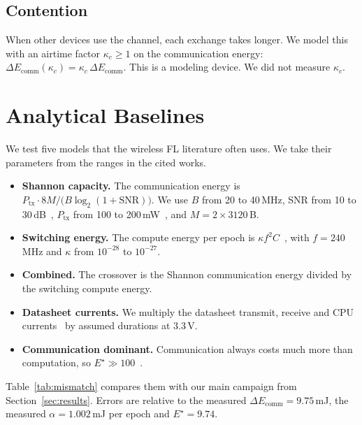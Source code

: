 \documentclass[journal]{IEEEtran}
\newcommand{\Estar}{E^{\star}}
\begin{document}
\subsection{Contention}
When other devices use the channel, each exchange takes longer. We model this with an airtime factor $\kappa_c\ge1$ on the communication energy: $\Delta E_{\mathrm{comm}}(\kappa_c)=\kappa_c\,\Delta E_{\mathrm{comm}}$. This is a modeling device. We did not measure $\kappa_c$.

\section{Analytical Baselines}
\label{sec:baselines}
We test five models that the wireless FL literature often uses. We take their parameters from the ranges in the cited works.
\begin{itemize}
\item \textbf{Shannon capacity.} The communication energy is $P_{\mathrm{tx}}\cdot 8M/\bigl(B\log_2(1+\mathrm{SNR})\bigr)$. We use $B$ from 20 to 40\,MHz, SNR from 10 to 30\,dB~\cite{chen2022federated,zhao2023energy}, $P_{\mathrm{tx}}$ from 100 to 200\,mW~\cite{espressif_esp32s3_datasheet}, and $M=2\times3120$\,B.
\item \textbf{Switching energy.} The compute energy per epoch is $\kappa f^2 C$~\cite{zhou2022joint,pham2022energy,ren2022toward}, with $f=240$\,MHz and $\kappa$ from $10^{-28}$ to $10^{-27}$.
\item \textbf{Combined.} The crossover is the Shannon communication energy divided by the switching compute energy.
\item \textbf{Datasheet currents.} We multiply the datasheet transmit, receive and CPU currents~\cite{espressif_esp32s3_datasheet} by assumed durations at 3.3\,V.
\item \textbf{Communication dominant.} Communication always costs much more than computation, so $\Estar\gg100$~\cite{mcmahan2017communication}.
\end{itemize}
Table~\ref{tab:mismatch} compares them with our main campaign from Section~\ref{sec:results}. Errors are relative to the measured $\Delta E_{\mathrm{comm}}=9.75$\,mJ, the measured $\alpha=1.002$\,mJ per epoch and $\Estar=9.74$.
\end{document}
